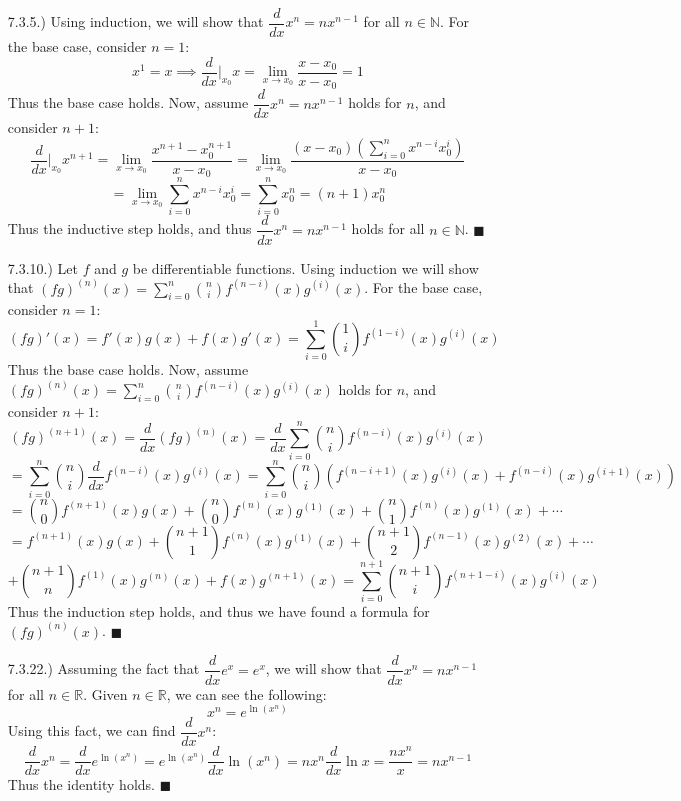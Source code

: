 \documentclass[12pt]{article}
\newcommand{\parens}[1]{\left(#1\right)}             %
\newcommand{\N}{\mathbb{N}}
\newcommand{\R}{\mathbb{R}}
\newcommand{\derv}[2]{\dfrac{d#1}{d#2}}
\newcommand{\lm}[1]{\displaystyle\lim_{#1}}
\begin{document}
\pagestyle{fancy}
\fancyhead{}

\normalsize

\begin{itemize}
    \item [7.3.5.)] Using induction, we will show that $\derv{}{x}x^n=nx^{n-1}$ for all $n\in\N$. For the base case, consider $n=1$:
    \[x^1=x\implies \derv{}{x}\bigg\vert_{x_0}x=\lm{x\to x_0}\frac{x-x_0}{x-x_0}=1\]
    Thus the base case holds. Now, assume $\derv{}{x}x^n=nx^{n-1}$ holds for $n$, and consider $n+1$:
    \[\derv{}{x}\bigg\vert_{x_0}x^{n+1}=\lm{x\to x_0}\frac{x^{n+1}-x_0^{n+1}}{x-x_0}=\lm{x\to x_0}\frac{(x-x_0)\displaystyle\parens{\sum_{i=0}^{n}x^{n-i}x_0^i}}{x-x_0}\]
    \[=\lm{x\to x_0}\sum_{i=0}^{n}x^{n-i}x_0^i=\sum_{i=0}^nx_0^n=(n+1)x_0^n\]
    Thus the inductive step holds, and thus $\derv{}{x}x^n=nx^{n-1}$ holds for all $n\in\N$. $\blacksquare$

    \item [7.3.10.)] Let $f$ and $g$ be differentiable functions. Using induction we will show that $(fg)^{(n)}(x)=\displaystyle\sum_{i=0}^n\binom{n}{i}f^{(n-i)}(x)g^{(i)}(x)$. For the base case, consider $n=1$:
    \[(fg)'(x)=f'(x)g(x)+f(x)g'(x)=\sum_{i=0}^1\binom{1}{i}f^{(1-i)}(x)g^{(i)}(x)\]
    Thus the base case holds. Now, assume $(fg)^{(n)}(x)=\displaystyle\sum_{i=0}^n\binom{n}{i}f^{(n-i)}(x)g^{(i)}(x)$ holds for $n$, and consider $n+1$:
    \[(fg)^{(n+1)}(x)=\derv{}{x}(fg)^{(n)}(x)=\derv{}{x}\sum_{i=0}^n\binom{n}{i}f^{(n-i)}(x)g^{(i)}(x)\]
    \[=\sum_{i=0}^n\binom{n}{i}\derv{}{x}f^{(n-i)}(x)g^{(i)}(x)=\sum_{i=0}^n\binom{n}{i}\parens{f^{(n-i+1)}(x)g^{(i)}(x)+f^{(n-i)}(x)g^{(i+1)}(x)}\]
    \[=\binom{n}{0}f^{(n+1)}(x)g(x)+\binom{n}{0}f^{(n)}(x)g^{(1)}(x)+\binom{n}{1}f^{(n)}(x)g^{(1)}(x)+\cdots\]
    \[=f^{(n+1)}(x)g(x)+\binom{n+1}{1}f^{(n)}(x)g^{(1)}(x)+\binom{n+1}{2}f^{(n-1)}(x)g^{(2)}(x)+\cdots\]
    \[+\binom{n+1}{n}f^{(1)}(x)g^{(n)}(x)+f(x)g^{(n+1)}(x)=\sum_{i=0}^{n+1}\binom{n+1}{i}f^{(n+1-i)}(x)g^{(i)}(x)\]
    Thus the induction step holds, and thus we have found a formula for $(fg)^{(n)}(x)$. $\blacksquare$

    \pagebreak
    \item [7.3.22.)] Assuming the fact that $\derv{}{x}e^x=e^x$, we will show that $\derv{}{x}x^n=nx^{n-1}$ for all $n\in\R$. Given $n\in\R$, we can see the following:
    \[x^n=e^{\ln\parens{x^n}}\]
    Using this fact, we can find $\derv{}{x}x^n$:
    \[\derv{}{x}x^n=\derv{}{x}e^{\ln\parens{x^n}}=e^{\ln\parens{x^n}}\derv{}{x}\ln\parens{x^n}=nx^n\derv{}{x}\ln x=\frac{nx^n}{x}=nx^{n-1}\]
    Thus the identity holds. $\blacksquare$
\end{itemize}
\end{document}

